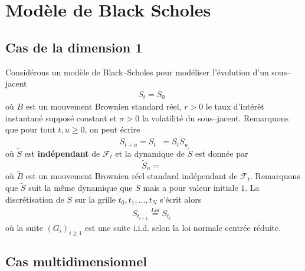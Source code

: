\documentclass[a4paper,11pt]{article}
\def\cf{{\mathcal F}}
\def\expp#1{\mathop {\mathrm{e}^{ #1}}}
\begin{document}
\section{Modèle de Black Scholes}
\label{sec:modele}
\subsection{Cas de la dimension 1}
\label{bs1d}

Considérons un modèle de Black--Scholes pour modéliser l'évolution d'un
sous--jacent
\begin{align*}
  S_t = S_0 \expp{(r - \sigma^2/2)t + \sigma B_t}
\end{align*}
où $B$ est un mouvement Brownien standard réel, $r>0$ le taux d'intérêt
instantané supposé constant et $\sigma>0$ la volatilité du sous--jacent.
Remarquons que pour tout $t, u \ge 0$, on peut écrire
\begin{equation}
  \label{flot} S_{t+u} = S_{t} \expp{(r- \sigma^2/2) u + \sigma (B_{t+u} - B_t)}
  = S_t \tilde S_u
\end{equation}
où $\tilde S$ est {\bf indépendant} de $\cf_t$ et la dynamique de $\tilde S$ est
donnée par
\begin{equation*}
  \tilde S_u = \expp{(r- \sigma^2/2) u + \sigma \tilde B_u}
\end{equation*}
où $\tilde B$ est un mouvement Brownien réel standard indépendant de $\cf_t$.
Remarquons que $\tilde S$ suit la même dynamique que $S$ mais a pour valeur
initiale $1$.
La discrétisation de $S$ sur la grille $t_0, t_1, \dots, t_N$ s'écrit alors
\begin{align*}
  S_{t_{i+1}} \stackrel{Loi}{=} S_{t_i} \expp{(r - \sigma^2/2) (t_{i+1} - t_i) + \sigma
  \sqrt{t_{i+1} - t_i} G_{i+1}}
\end{align*}
où la suite $(G_i)_{i \ge 1}$ est une suite i.i.d. selon la loi normale centrée
réduite.


\subsection{Cas multidimensionnel}
\label{bsnd}
\end{document}

